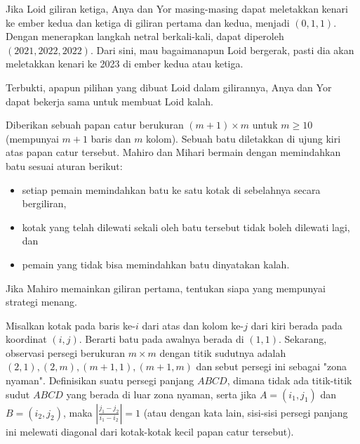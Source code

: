 \documentclass[12pt]{scrartcl}
\begin{document}
\begin{soaljawab}
\begin{solusi}
        Jika Loid giliran ketiga, Anya dan Yor masing-masing dapat meletakkan kenari ke ember kedua dan ketiga di giliran pertama dan kedua, menjadi $(0,1,1)$. Dengan menerapkan langkah netral berkali-kali, dapat diperoleh $(2021,2022,2022)$. Dari sini, mau bagaimanapun Loid bergerak, pasti dia akan meletakkan kenari ke 2023 di ember kedua atau ketiga.

        Terbukti, apapun pilihan yang dibuat Loid dalam gilirannya, Anya dan Yor dapat bekerja sama untuk membuat Loid kalah.
    \end{solusi}
\end{soaljawab}

\begin{soaljawab}
    Diberikan sebuah papan catur berukuran $(m+1) \times m$ untuk $m \ge 10$ (mempunyai $m+1$ baris dan $m$ kolom). Sebuah batu diletakkan di ujung kiri atas papan catur tersebut. Mahiro dan Mihari bermain dengan memindahkan batu sesuai aturan berikut:
    \begin{itemize}
        \item setiap pemain memindahkan batu ke satu kotak di sebelahnya secara bergiliran,
        \item kotak yang telah dilewati sekali oleh batu tersebut tidak boleh dilewati lagi, dan
        \item pemain yang tidak bisa memindahkan batu dinyatakan kalah.
    \end{itemize}
    Jika Mahiro memainkan giliran pertama, tentukan siapa yang mempunyai strategi menang.
    \begin{solusi}
        Misalkan kotak pada baris ke-$i$ dari atas dan kolom ke-$j$ dari kiri berada pada koordinat $(i,j)$. Berarti batu pada awalnya berada di $(1,1)$. Sekarang, observasi persegi berukuran $m \times m$ dengan titik sudutnya adalah  $(2,1), (2,m), (m+1,1), (m+1, m)$ dan sebut persegi ini sebagai "zona nyaman". Definisikan suatu persegi panjang $ABCD$, dimana tidak ada titik-titik sudut $ABCD$ yang berada di luar zona nyaman, serta jika $A=(i_1, j_1)$ dan $B=(i_2,j_2)$, maka $\left|\frac{j_1-j_2}{i_1-i_2}\right| = 1$ (atau dengan kata lain, sisi-sisi persegi panjang ini melewati diagonal dari kotak-kotak kecil papan catur tersebut).


\end{solusi}
\end{soaljawab}
\end{document}

